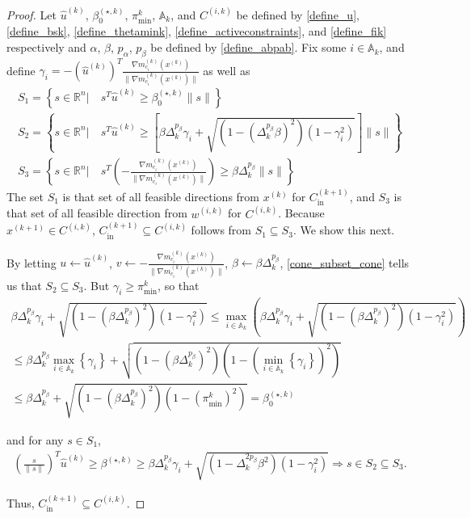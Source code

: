 \documentclass{article}
\theoremstyle{case}
\numberwithin{theorem}{subsection}
\newcommand{\activeconstraintsk}{{\mathbb A_{k}}}
\newcommand{\bs}{{\beta^{(\star, k)}}}
\newcommand{\bsk}{{\beta_0^{(\star, k)}}}
\newcommand{\dk}{\Delta_k}
\newcommand{\fcki}{{C^{(k+1)}_{\textrm{in}}}}
\newcommand{\gmcik}{{\nabla m_{c_i}^{(k)}\left(\xk\right)}}
\newcommand{\hgik}{{\frac{\nabla m^{(k)}_{c_i}(\xk)}{\|\nabla m^{(k)}_{c_i}\left(\xk\right)\|}}}
\newcommand{\huk}{{{\hat u}^{(k)}}}
\newcommand{\Rn}{\mathbb R^n}
\newcommand{\thetamink}{{\pi^k_{\textrm{min}}}}
\newcommand{\wik}{{w^{(i, k)}}}
\newcommand{\xkpo}{{{x}^{(k+1)}}}
\newcommand{\xk}{x^{(k)}}
\newcommand{\fik}{{C^{(i, k)}}}
\begin{document}
\begin{proof}
Let 
$\huk$, $\bsk$, $\thetamink$, $\activeconstraintsk$, and $\fik$
be defined by
\cref{define_u}, \cref{define_bsk}, \cref{define_thetamink}, \cref{define_activeconstraints}, and \cref{define_fik} 
respectively and $\alpha$, $\beta$, $p_{\alpha}$, $p_{\beta}$ be defined by \cref{define_abpab}.
Fix some $i \in \activeconstraintsk$, and define $\gamma_i = -\left(\huk\right)^T\hgik$ as well as
\begin{align*}
S_1 = \left\{s\in\Rn | \quad s^T\huk\ge\bsk\|s\| \right\} \\
S_2 = \left\{s\in\Rn | \quad s^T\huk\ge\left[\beta\dk^{p_{\beta}}\gamma_i + \sqrt{(1 - \left(\dk^{p_{\beta}}\beta\right)^2)\left(1 - \gamma_i^2\right)}\right]\|s\| \right\} \\
S_3 = \left\{s\in\Rn | \quad s^T\left(-\hgik\right)\ge\beta\dk^{p_{\beta}}\|s\| \right\}
\end{align*}
The set $S_1$ is that set of all feasible directions from $\xk$ for $\fcki$, and $S_3$ is that set of all feasible direction from $\wik$ for $\fik$.
Because $\xkpo \in \fik$, $\fcki \subseteq \fik$ follows from $S_1 \subseteq S_3$.
We show this next.


By letting $u \gets \huk$, $v \gets -\hgik$, $\beta \gets \beta \dk^{p_{\beta}}$, \cref{cone_subset_cone} tells us that
$S_2 \subseteq S_3$.
But $\gamma_i \ge \thetamink$, so that
\begin{align*}
\beta\dk^{p_{\beta}}\gamma_i + \sqrt{\left(1 - \left(\beta\dk^{p_{\beta}}\right)^2\right)\left(1 - \gamma_i^2\right)}
\le \max_{i\in\activeconstraintsk} \left(\beta\dk^{p_{\beta}}\gamma_i + \sqrt{\left(1 - \left(\beta\dk^{p_{\beta}}\right)^2\right)\left(1 - \gamma_i^2\right)}\right) \\
\le \beta\dk^{p_{\beta}} \max_{i\in\activeconstraintsk}\left\{\gamma_i\right\} + \sqrt{\left(1 - \left(\beta\dk^{p_{\beta}}\right)^2\right)\left(1 - \left(\min_{i\in\activeconstraintsk}\left\{\gamma_i\right\}\right)^2\right)} \\
\le \beta\dk^{p_{\beta}} + \sqrt{\left(1 - \left(\beta\dk^{p_{\beta}}\right)^2\right)\left(1 - \left(\thetamink\right)^2\right)} = \bsk
\end{align*}

and for any $s\in S_1$,
\begin{align*}
\left(\frac{s}{\|s\|}\right)^T\huk \ge \bs 
\ge \beta\dk^{p_{\beta}}\gamma_i + \sqrt{(1 - \dk^{2p_{\beta}}\beta^2)\left(1 - \gamma_i^2\right)}
\Longrightarrow s \in S_2 \subseteq S_3.
\end{align*}

Thus, $\fcki \subseteq \fik$.
\end{proof}
\end{document}
